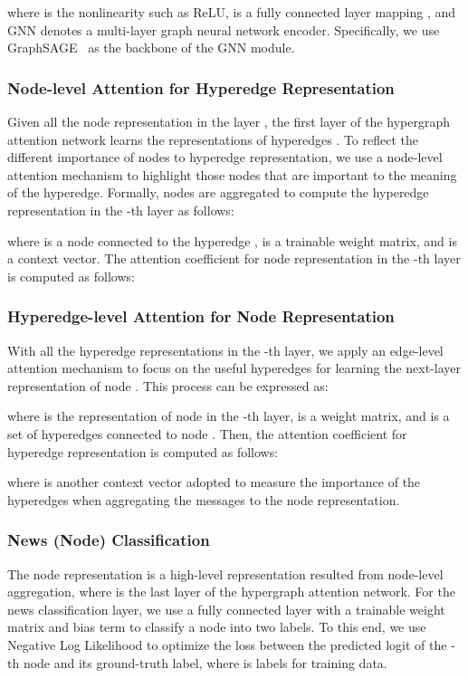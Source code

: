 \documentclass[conference]{IEEEtran}
\begin{document}
where  is the nonlinearity such as ReLU,  is a fully connected layer mapping , and GNN denotes a multi-layer graph neural network encoder. Specifically, we use GraphSAGE~\cite{hamilton2017inductive} as the backbone of the GNN module.

\subsubsection{Node-level Attention for Hyperedge Representation}
Given all the node representation  in the layer , the first layer of the hypergraph attention network learns the representations of hyperedges . To reflect the different importance of nodes to hyperedge representation, we use a node-level attention mechanism to highlight those nodes that are important to the meaning of the hyperedge. Formally, nodes are aggregated to compute the hyperedge representation  in the -th layer as follows:









where  is a node connected to the hyperedge ,  is a trainable weight matrix, and  is a context vector. The attention coefficient  for node representation  in the -th layer is computed as follows:



\subsubsection{Hyperedge-level Attention for Node Representation}
With all the hyperedge representations  in the -th layer, we apply an edge-level attention mechanism to focus on the useful hyperedges for learning the next-layer representation of node . This process can be expressed as:

where  is the representation of node  in the -th layer,  is a weight matrix, and  is a set of hyperedges connected to node . Then, the attention coefficient  for hyperedge representation  is computed as follows:


where  is another context vector adopted to measure the importance of the hyperedges when aggregating the messages to the node representation. 



\subsubsection{News (Node) Classification} The node representation  is a high-level representation resulted from node-level aggregation, where  is the last layer of the hypergraph attention network. For the news classification layer, we use a fully connected layer with a trainable weight matrix  and bias term  to classify a node into two labels. To this end, we use Negative Log Likelihood to optimize the loss between the predicted logit of the -th node  and its ground-truth label,  where  is labels for training data.
\end{document}
